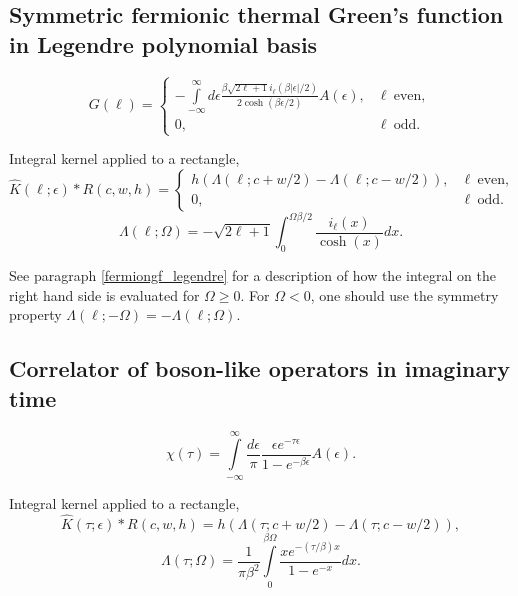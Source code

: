 \documentclass[]{article}
\begin{document}
\subsection{Symmetric fermionic thermal Green's function in Legendre polynomial basis}
\label{fermiongfsymm_legendre}

\begin{equation}
    G(\ell) = \left\{
    \begin{array}{ll}
        -\int\limits_{-\infty}^\infty
        d\epsilon
        \frac{\beta\sqrt{2\ell+1} i_{\ell}(\beta|\epsilon|/2)}
        {2\cosh(\beta\epsilon/2)} A(\epsilon), &\ell\ \mathrm{ even},\\
        0, &\ell\ \mathrm{odd}.
    \end{array}\right.
\end{equation}

Integral kernel applied to a rectangle,
\begin{equation}
    \hat K(\ell;\epsilon)*R(c,w,h) = \left\{
    \begin{array}{ll}
        h(\Lambda(\ell;c+w/2)-\Lambda(\ell;c-w/2)), &\ell\ \mathrm{ even},\\
        0, &\ell\ \mathrm{odd}.
    \end{array}\right.
\end{equation}
\begin{equation}
	\Lambda(\ell;\Omega) = -\sqrt{2\ell+1}
    \int_0^{\Omega\beta/2} \frac{i_\ell(x)}{\cosh(x)} dx.
\end{equation}

See paragraph \ref{fermiongf_legendre} for a description of how the integral on
the right hand side is evaluated for $\Omega\geq0$. For $\Omega<0$, one should use the symmetry property $\Lambda(\ell;-\Omega) = -\Lambda(\ell;\Omega)$.

\subsection{Correlator of boson-like operators in imaginary time}
\label{bosoncorr_imtime}
\begin{equation}
	\chi(\tau) = \int\limits_{-\infty}^\infty \frac{d\epsilon}{\pi}
	\frac{\epsilon e^{-\tau\epsilon}}{1-e^{-\beta\epsilon}} A(\epsilon).
\end{equation}

Integral kernel applied to a rectangle,
\begin{equation}
\hat K(\tau;\epsilon)*R(c,w,h) =
h(\Lambda(\tau;c+w/2) - \Lambda(\tau;c-w/2)),
\end{equation}
\begin{equation}
\Lambda(\tau;\Omega) = \frac{1}{\pi\beta^2}
\int\limits_0^{\beta\Omega}\frac{xe^{-(\tau/\beta)x}}{1-e^{-x}}dx.
\end{equation}
\end{document}
